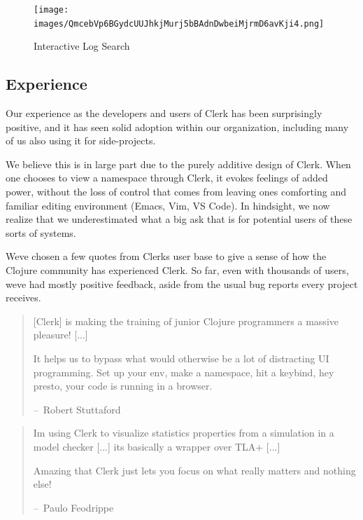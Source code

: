 \documentclass[sigconf,screen,pbalance=true]{acmart}
\begin{document}
\begin{figure}
\hypertarget{interactive-log-search}{%
\centering
\texttt{[image: images/QmcebVp6BGydcUUJhkjMurj5bBAdnDwbeiMjrmD6avKji4.png]}
\caption{Interactive Log Search}\label{interactive-log-search}
}
\end{figure}

\hypertarget{experience}{%
\subsection{Experience}\label{experience}}

Our experience as the developers and users of Clerk has been surprisingly positive, and it has seen solid adoption within our organization, including many of us also using it for side-projects.

We believe this is in large part due to the purely additive design of Clerk. When one chooses to view a namespace through Clerk, it evokes feelings of added power, without the loss of control that comes from leaving one\textquotesingle s comforting and familiar editing environment (Emacs, Vim, VS Code). In hindsight, we now realize that we underestimated what a big ask that is for potential users of these sorts of systems.

We\textquotesingle ve chosen a few quotes from Clerk\textquotesingle s user base to give a sense of how the Clojure community has experienced Clerk. So far, even with thousands of users, we\textquotesingle ve had mostly positive feedback, aside from the usual bug reports every project receives.

\begin{quote}
{[}Clerk{]} is making the training of junior Clojure programmers a massive pleasure! {[}...{]}

It helps us to bypass what would otherwise be a lot of distracting UI programming. Set up your env, make a namespace, hit a keybind, hey presto, your code is running in a browser.

--~Robert Stuttaford
\end{quote}

\begin{quote}
I\textquotesingle m using Clerk to visualize statistics properties from a simulation in a model checker {[}...{]} it\textquotesingle s basically a wrapper over TLA+ {[}...{]}

Amazing that Clerk just lets you focus on what really matters and nothing else!

--~Paulo Feodrippe
\end{quote}
\end{document}
